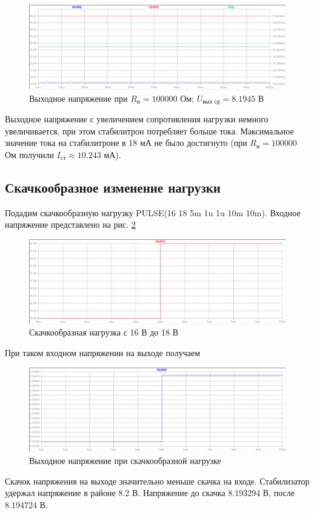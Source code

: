 \documentclass[a4paper, 12pt]{article}
\begin{document}
    \begin{figure}[H]
        \centering
        \includegraphics[scale=0.46]{1task_R100k.png}
        \captionsetup{skip=0pt}
        \caption{Выходное напряжение при $R_{\text{н}}=100000$ Ом; $U_{\text{вых ср}}=8.1945$ В}
        \label{fig:1task_R100k}
    \end{figure}
    \noindent Выходное напряжение с увеличением сопротивления нагрузки немного увеличивается,
    при этом стабилитрон потребляет больше тока. Максимальное значение тока на стабилитроне в 18 мА
    не было достигнуто (при $R_{\text{н}}=100000$ Ом получили $I_{\text{ст}}\approx10.243$ мА).


    \subsection{Скачкообразное изменение нагрузки}
    Подадим скачкообразную нагрузку PULSE(16 18 5m 1u 1u 10m 10m). Входное напряжение
    представлено на рис. \ref{fig:1task_rect_input0}
    \begin{figure}[H]
        \centering
        \includegraphics[scale=0.46]{1task_rect_input0.png}
        \captionsetup{skip=0pt}
        \caption{Скачкообразная нагрузка с 16 В до 18 В}
        \label{fig:1task_rect_input0}
    \end{figure}
    При таком входном напряжении на выходе получаем
    \begin{figure}[H]
        \centering
        \includegraphics[scale=0.46]{1task_rect.png}
        \captionsetup{skip=0pt}
        \caption{Выходное напряжение при скачкообразной нагрузке}
        \label{fig:1task_rect}
    \end{figure}
    \noindent Скачок напряжения на выходе значительно меньше скачка на входе. Стабилизатор
    удержал напряжение в районе 8.2 В. Напряжение до скачка 8.193294 В, после 8.194724 В.
\end{document}
